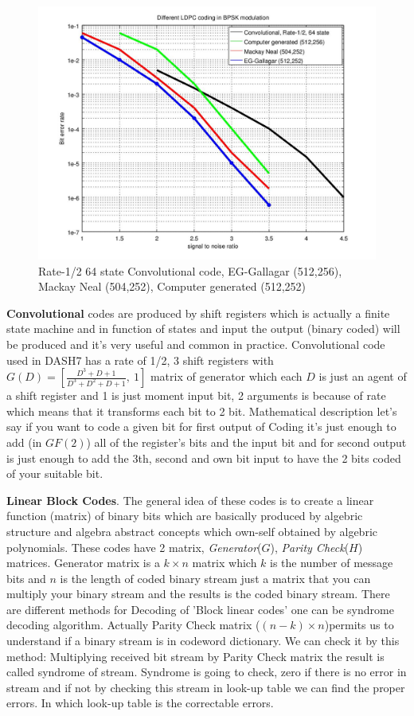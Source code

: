 \begin{figure}[h]
\centering
\includegraphics[scale=0.6]{Figures/ber_ldpc.jpg}
\caption{Rate-1/2 64 state Convolutional code, EG-Gallagar (512,256), Mackay Neal (504,252), Computer generated (512,252)}
\label{ber_ldpc}
\end{figure}



\textbf{Convolutional} codes are produced by shift registers which is actually a finite state machine and in function of states and input the output (binary coded) will be produced and  it's very useful and common in practice. Convolutional code used in DASH7 has a rate of 1/2, 3 shift registers with $G(D) = [\frac{D^3+D+1}{D^3+D^2+D+1},\ 1]$ matrix of generator which each $D$ is just an agent of a shift register and 1 is just moment input bit, 2 arguments is because of rate which means that it transforms each bit to 2 bit. Mathematical description let's say if you want to code a given bit for first output of Coding it's just enough to add (in $GF(2)$) all of the register's bits and the input bit and for second output is just enough to add the 3th, second and own bit input to have the 2 bits coded of your suitable bit.  

\textbf{Linear Block Codes}. The  general idea of these codes is to create a linear function (matrix) of binary bits which are basically produced by algebric structure and algebra abstract concepts which own-self obtained by algebric polynomials. These codes have 2 matrix, \textit{Generator}($G$), \textit{Parity Check}($H$) matrices. Generator matrix is a $k \times n$ matrix which $k$ is the number of message bits and $n$ is the length of coded binary stream just a matrix that you can multiply your binary stream and the results is the coded binary stream. There are different methods for Decoding of 'Block linear codes' one can be syndrome decoding algorithm. Actually Parity Check matrix  ($ (n-k) \times n$)permits us to understand if a binary stream is in codeword dictionary. We can check it by this method: Multiplying received bit stream by Parity Check matrix the result is called syndrome of stream. Syndrome is going to check, zero if there is no error in stream and if not by checking this stream in look-up table we can find the proper errors. In which look-up table is the correctable errors.




